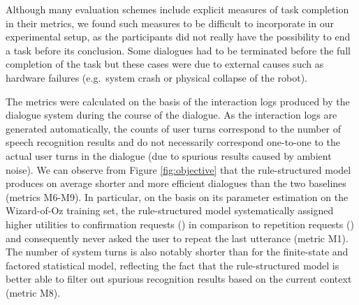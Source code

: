 Although many evaluation schemes include explicit measures of task completion in their metrics, we found such measures to be difficult to incorporate in our experimental setup, as the participants did not really have the possibility to end a task before its conclusion. Some dialogues had to be terminated before the full completion of the task but these cases were due to external causes such as hardware failures (e.g.\ system crash or physical collapse of the robot).
 
The metrics were calculated on the basis of the interaction logs produced by the dialogue system during the course of the dialogue. As the interaction logs are generated automatically, the counts of user turns correspond to the number of speech recognition results and do not necessarily correspond one-to-one to the actual user turns in the dialogue (due to spurious results caused by ambient noise). We can observe from Figure \ref{fig:objective} that the rule-structured model produces on average shorter and more efficient dialogues than the two baselines (metrics M6-M9).  In particular, on the basis on its parameter estimation on the Wizard-of-Oz training set, the rule-structured model systematically assigned higher utilities to confirmation requests () in comparison to repetition requests () and 
consequently never asked the user to repeat the last utterance (metric M1). The number of system turns is also notably shorter than for the finite-state and factored statistical model, reflecting the fact that the rule-structured model is better able to filter out spurious recognition results based on the current context (metric M8). 

